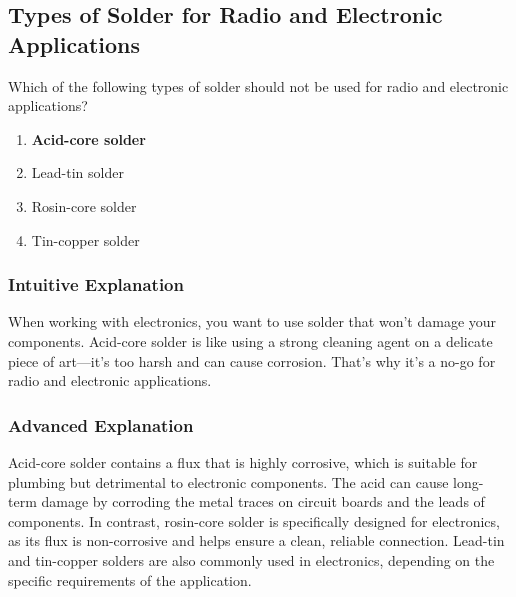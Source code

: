 \subsection{Types of Solder for Radio and Electronic Applications}
\label{T7D08}

\begin{tcolorbox}[colback=gray!10!white,colframe=black!75!black,title=T7D08]
Which of the following types of solder should not be used for radio and electronic applications?
\begin{enumerate}[noitemsep]
    \item \textbf{Acid-core solder}
    \item Lead-tin solder
    \item Rosin-core solder
    \item Tin-copper solder
\end{enumerate}
\end{tcolorbox}

\subsubsection{Intuitive Explanation}
When working with electronics, you want to use solder that won't damage your components. Acid-core solder is like using a strong cleaning agent on a delicate piece of art—it’s too harsh and can cause corrosion. That’s why it’s a no-go for radio and electronic applications.

\subsubsection{Advanced Explanation}
Acid-core solder contains a flux that is highly corrosive, which is suitable for plumbing but detrimental to electronic components. The acid can cause long-term damage by corroding the metal traces on circuit boards and the leads of components. In contrast, rosin-core solder is specifically designed for electronics, as its flux is non-corrosive and helps ensure a clean, reliable connection. Lead-tin and tin-copper solders are also commonly used in electronics, depending on the specific requirements of the application.